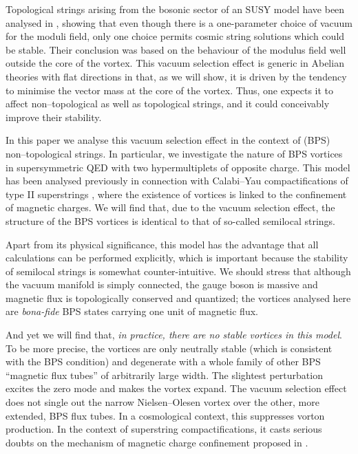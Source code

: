 \documentclass[a4paper,aps,prd,superscriptaddress,floats]{revtex4}
\begin{document}
Topological strings arising from the bosonic sector of an \coordHE{}
 SUSY model have been analysed in \cite{PRTT96}, showing that even
 though there is a one-parameter choice of vacuum for the moduli
 field, only one choice permits cosmic string solutions which could be
 stable. Their conclusion was based on the behaviour of the modulus
 field well outside the core of the vortex. This vacuum selection
 effect is generic in Abelian theories with flat directions in that,
 as we will show, it is driven by the tendency to minimise the vector
 mass at the core of the vortex. Thus, one expects it to affect
 non--topological as well as topological strings, and  it could
 conceivably improve their stability.

In this paper we analyse this vacuum selection effect in the context
of (BPS) non--topological strings.  In particular, we investigate
the nature of BPS vortices in \coordHE{} supersymmetric QED with two
hypermultiplets of opposite charge. This model has been analysed
previously in connection with Calabi--Yau compactifications of type II
superstrings \cite{GMV96}, where the existence of vortices is linked to the
confinement of magnetic charges. We will find that, due to the
vacuum selection effect, the structure of the BPS vortices is
identical to that of so-called semilocal strings\cite{VA91}.


Apart from its physical significance, this model has the 
advantage that all calculations can be performed explicitly, which is
important because the stability of semilocal strings is somewhat
counter-intuitive.  We should stress that although the vacuum manifold
is simply connected, the gauge boson is massive and magnetic flux is
topologically conserved and quantized; the vortices analysed here
are {\it bona-fide} BPS states carrying one unit of magnetic flux.

And yet we will find that, {\it in practice, there are no stable
vortices in this model}. To be more precise, the vortices are only
neutrally stable (which is consistent with the BPS condition) and
degenerate with a whole family of other BPS ``magnetic flux tubes'' of
arbitrarily large width. The slightest perturbation excites the zero
mode and makes the vortex expand.  The vacuum selection effect does
not single out the narrow Nielsen--Olesen vortex over the other, more
extended, BPS flux tubes.  In a cosmological context, this suppresses
vorton production. In the context of superstring compactifications, it
casts serious doubts on the mechanism of magnetic charge confinement
proposed in \cite{GMV96}.
\end{document}

